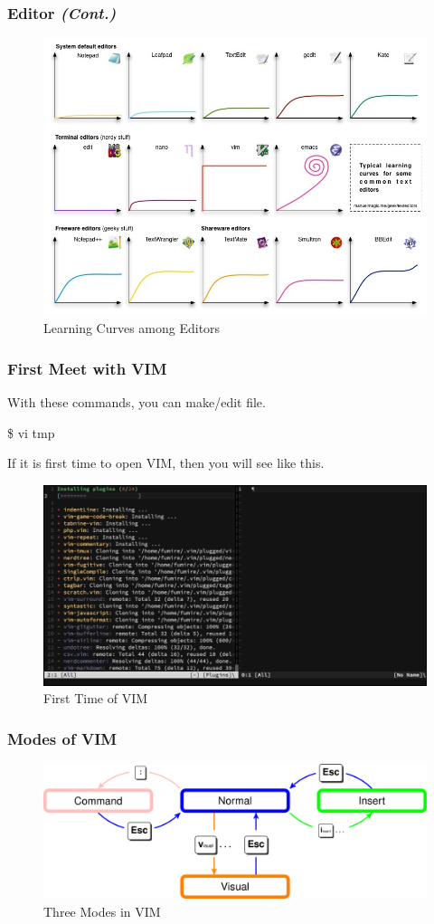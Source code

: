 \documentclass{beamer}
\begin{document}
	\begin{frame}
		\frametitle{Editor \textit{(Cont.)}}
		\begin{figure}[h!]
			\centering
			\includegraphics[width=0.7 \linewidth]{figures/curves.jpg}
			\caption{Learning Curves among Editors}
		\end{figure}
	\end{frame}

	\begin{frame}
		\frametitle{First Meet with VIM}
		With these commands, you can make/edit file.
		\begin{example}
			\$ vi tmp
		\end{example}
	
		If it is first time to open VIM, then you will see like this. 
		\begin{figure}[h!]
			\centering
			\includegraphics[width=0.5 \linewidth]{figures/9.png}
			\caption{First Time of VIM}
		\end{figure}
	\end{frame}

	\begin{frame}
		\frametitle{Modes of VIM}
		\begin{figure}[h!]
			\centering
			\includegraphics[width=0.7 \linewidth]{figures/modes.png}
			\caption{Three Modes in VIM}
		\end{figure}
	\end{frame}
\end{document}
